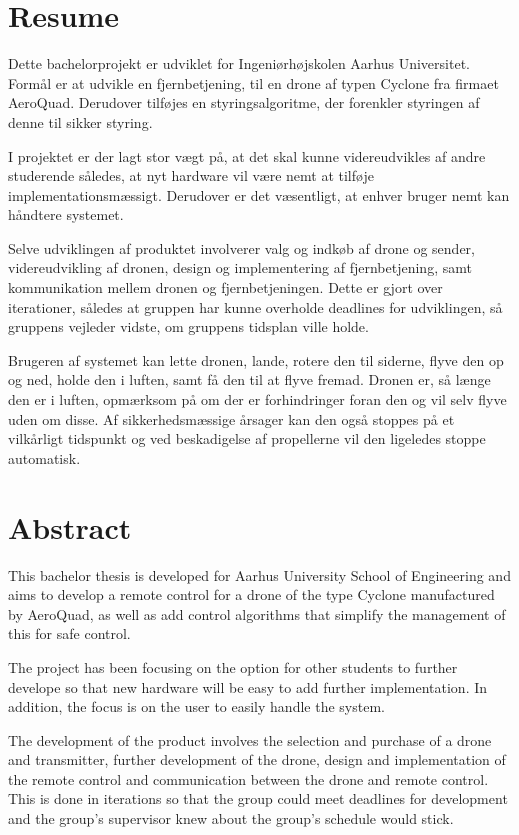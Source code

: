\documentclass[Main]{subfiles}
\begin{document}
\chapter*{Resume}

Dette bachelorprojekt er udviklet for Ingeniørhøjskolen Aarhus Universitet. 
Formål er at udvikle en fjernbetjening, til en drone af typen Cyclone fra firmaet AeroQuad. 
Derudover tilføjes en styringsalgoritme, der forenkler styringen af denne til sikker styring.

I projektet er der lagt stor vægt på, at det skal kunne videreudvikles af andre studerende således, at nyt hardware vil være nemt at tilføje implementationsmæssigt.
Derudover er det væsentligt, at enhver bruger nemt kan håndtere systemet.

Selve udviklingen af produktet involverer valg og indkøb af drone og sender, videreudvikling af dronen, design og implementering af fjern\-betjening, samt kommunikation mellem dronen og fjernbetjeningen.
Dette er gjort over iterationer, således at gruppen har kunne overholde deadlines for udviklingen, så gruppens vejleder vidste, om gruppens tidsplan ville holde.

Brugeren af systemet kan lette dronen, lande, rotere den til siderne, flyve den op og ned, holde den i luften, samt få den til at flyve fremad.
Dronen er, så længe den er i luften, opmærksom på om der er forhindringer foran den og vil  selv flyve uden om disse.
Af sikkerhedsmæssige årsager kan den også stoppes på et vilkårligt tidspunkt og ved beskadigelse af propellerne vil den ligeledes stoppe automatisk.




\chapter*{Abstract}

This bachelor thesis is developed for Aarhus University School of Engineering and aims to develop a remote control for a drone of the type Cyclone manufactured by AeroQuad, as well as add control algorithms that simplify the management of this for safe control.

The project has been focusing on the option for other students to further develope so that new hardware will be easy to add further implementation.
In addition, the focus is on the user to easily handle the system.

The development of the product involves the selection and purchase of a drone and transmitter,  further development of the drone, design and implementation of the remote control and communication between the drone and remote control.
This is done in iterations so that the group could meet deadlines for development and the group's supervisor knew about the group's schedule would stick.
\end{document}
